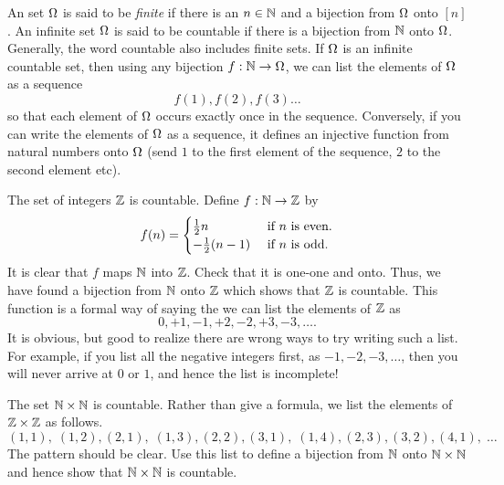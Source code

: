 \documentclass[preprint,  11pt]{amsart}
\def\half{\frac{1}{2}}
\begin{document}


\bdefn An set $\Omega$ is said to be {\em finite} if there is an $n\in \mathbb{N}$ and a bijection from $\Omega$ onto $[n]$. An infinite set $\Omega$ is said to be countable if there is a bijection from $\mathbb{N}$ onto $\Omega$.
\edefn
Generally, the word countable also includes finite sets. If $\Omega$ is an infinite countable set, then using any bijection $f:\mathbb{N}\rightarrow \Omega$, we can list the elements of $\Omega$ as a sequence $$f(1),f(2),f(3)\ldots$$ so that each element of $\Omega$ occurs exactly once in the sequence. Conversely, if you can write the elements of $\Omega$ as a sequence, it defines an injective function from natural numbers onto $\Omega$ (send $1$ to the first element of the sequence, $2$ to the second element etc).

\beg The set of integers $\mathbb{Z}$ is countable. Define $f:\mathbb{N}\rightarrow \mathbb{Z}$ by
$$
f(n)=\begin{cases}\half n & \mb{ if }n\mb{ is even}. \\
-\half (n-1) & \mb{ if }n\mb{ is odd}.
\end{cases}
$$
It is clear that $f$ maps $\mathbb{N}$ into $\mathbb{Z}$. Check that it is one-one and onto. Thus, we have found a bijection from $\mathbb{N}$ onto $\mathbb{Z}$ which shows that $\mathbb{Z}$ is countable. This function is a formal way of saying the we can list the elements of $\mathbb{Z}$ as
$$
0, +1, -1,+2,-2,+3,-3,\ldots.
$$
It is obvious, but good to realize there are wrong ways to try writing such a list. For example, if you list all the negative integers first, as $-1,-2,-3,\ldots$, then you will never arrive at $0$ or $1$, and hence the list is incomplete!
\eeg

\beg The set $\mathbb{N}\times \mathbb{N}$ is countable. Rather than give a formula, we list the elements of $\mathbb{Z}\times \mathbb{Z}$ as follows.
$$
(1,1), \; (1,2), (2,1), \; (1,3), (2,2), (3,1), \; (1,4),(2,3),(3,2),(4,1),  \; \ldots
$$
The pattern should be clear. Use this list to define a bijection from $\mathbb{N}$ onto $\mathbb{N}\times \mathbb{N}$ and hence show that $\mathbb{N}\times \mathbb{N}$ is countable.
\eeg
\end{document}

